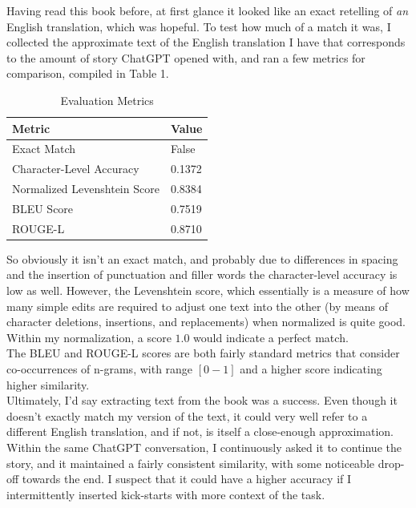 \documentclass{article}
\begin{document}
Having read this book before, at first glance it looked like an exact retelling of \textit{an} English translation, which was hopeful. To test how much of a match it was, I collected the approximate text of the English translation I have that corresponds to the amount of story ChatGPT opened with, and ran a few metrics for comparison, compiled in Table 1. \\

	\begin{table}[h!]
		\centering
		\begin{tabular}{@{}ll@{}}
			\toprule
			\textbf{Metric}                   & \textbf{Value}            \\ \midrule
			Exact Match                       & False                     \\
			Character-Level Accuracy          & 0.1372                    \\
			Normalized Levenshtein Score      & 0.8384                    \\
			BLEU Score                        & 0.7519                    \\
			ROUGE-L                           & 0.8710                    \\ \bottomrule
		\end{tabular}
		\caption{Evaluation Metrics}
		\label{tab:metrics}
	\end{table}


So obviously it isn't an exact match, and probably due to differences in spacing and the insertion of punctuation and filler words the character-level accuracy is low as well. However, the Levenshtein score, which essentially is a measure of how many simple edits are required to adjust one text into the other (by means of character deletions, insertions, and replacements) when normalized is quite good. Within my normalization, a score $1.0$ would indicate a perfect match. \\

The BLEU and ROUGE-L scores are both fairly standard metrics that consider co-occurrences of n-grams, with range $[0-1]$ and a higher score indicating higher similarity.
\\

Ultimately, I'd say extracting text from the book was a success. Even though it doesn't exactly match my version of the text, it could very well refer to a different English translation, and if not, is itself a close-enough approximation. Within the same ChatGPT conversation, I continuously asked it to continue the story, and it maintained a fairly consistent similarity, with some noticeable drop-off towards the end. I suspect that it could have a higher accuracy if I intermittently inserted kick-starts with more context of the task.
\end{document}
